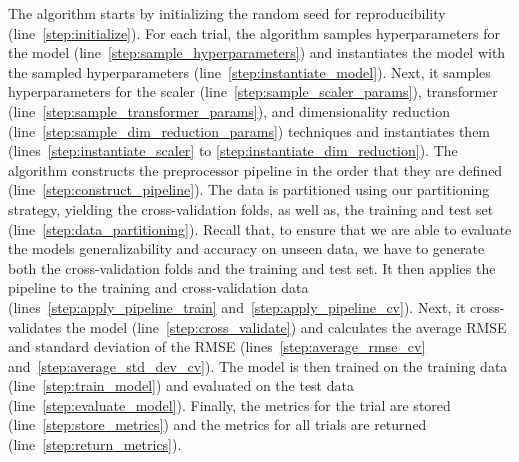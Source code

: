The algorithm starts by initializing the random seed for reproducibility (line~\ref{step:initialize}).
For each trial, the algorithm samples hyperparameters for the model (line~\ref{step:sample_hyperparameters}) and instantiates the model with the sampled hyperparameters (line~\ref{step:instantiate_model}).
Next, it samples hyperparameters for the scaler (line~\ref{step:sample_scaler_params}), transformer (line~\ref{step:sample_transformer_params}), and dimensionality reduction (line~\ref{step:sample_dim_reduction_params}) techniques and instantiates them (lines~\ref{step:instantiate_scaler} to \ref{step:instantiate_dim_reduction}).
The algorithm constructs the preprocessor pipeline in the order that they are defined (line~\ref{step:construct_pipeline}).
The data is partitioned using our partitioning strategy, yielding the cross-validation folds, as well as, the training and test set (line~\ref{step:data_partitioning}).
Recall that, to ensure that we are able to evaluate the models generalizability and accuracy on unseen data, we have to generate both the cross-validation folds and the training and test set.
It then applies the pipeline to the training and cross-validation data (lines~\ref{step:apply_pipeline_train} and~\ref{step:apply_pipeline_cv}).
Next, it cross-validates the model (line~\ref{step:cross_validate}) and calculates the average RMSE and standard deviation of the RMSE (lines~\ref{step:average_rmse_cv} and~\ref{step:average_std_dev_cv}).
The model is then trained on the training data (line~\ref{step:train_model}) and evaluated on the test data (line~\ref{step:evaluate_model}).
Finally, the metrics for the trial are stored (line~\ref{step:store_metrics}) and the metrics for all trials are returned (line~\ref{step:return_metrics}).